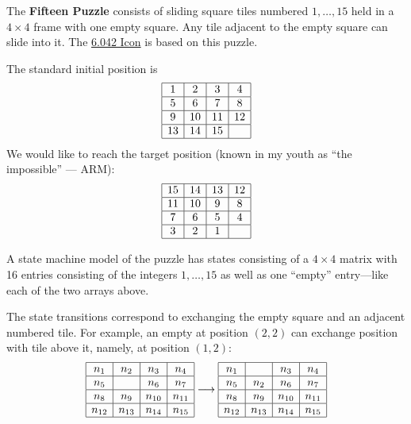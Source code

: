 \documentclass[handout]{mcs}
\begin{document}
\begin{problem} 
The \textbf{Fifteen Puzzle} consists of sliding square tiles numbered
$1,\dots,15$ held in a $4\times4$ frame with one empty square.  Any tile
adjacent to the empty square can slide into it.  The
\href{http://theory.lcs.mit.edu/classes/6.042/spring02/}{6.042 Icon} is
based on this puzzle.

The standard initial position is
\[\begin{array}{|c|c|c|c|}
\hline 1 & 2 & 3 & 4\\
\hline 5 & 6 & 7 & 8\\
\hline 9 & 10 & 11 & 12\\
\hline 13 & 14  & 15 &  \\
\hline
\end{array}\]
We would like to reach the target position (known in my youth as ``the
impossible'' --- ARM):
\[\begin{array}{|c|c|c|c|}
\hline 15 & 14 & 13 & 12\\
\hline 11 & 10 & 9 & 8\\
\hline7 & 6 & 5 & 4\\
\hline3 & 2 & 1 & \\
\hline
\end{array}\]

A state machine model of the puzzle has states consisting of a $4\times 4$
matrix with 16 entries consisting of the integers $1,\dots,15$ as well as
one ``empty'' entry---like each of the two arrays above.

The state transitions correspond to exchanging the empty square and an
adjacent numbered tile.  For example, an empty at position $(2,2)$ can
exchange position with tile above it, namely, at position $(1,2)$:
\[\begin{array}{|c|c|c|c|}
\hline n_1 & n_2 & n_3 & n_4\\
\hline n_5 &  & n_6 & n_7\\
\hline n_8  & n_9 & n_{10} & n_{11}\\
\hline n_{12} & n_{13} & n_{14}  & n_{15}\\
\hline
\end{array} \longrightarrow
\begin{array}{|c|c|c|c|}
\hline n_1 &   & n_3 & n_4\\
\hline n_5 & n_2 & n_6 & n_7\\
\hline n_8  & n_9 & n_{10} & n_{11}\\
\hline n_{12} & n_{13} & n_{14}  & n_{15}\\
\hline
\end{array} 
\]


\end{problem}
\end{document}
